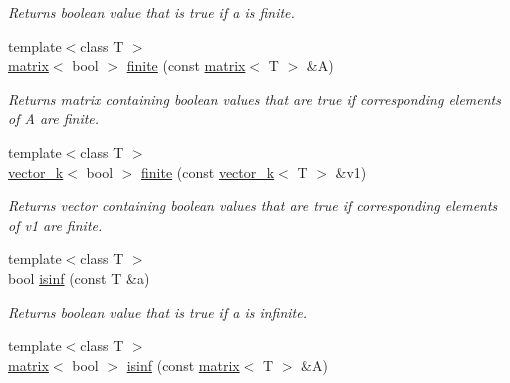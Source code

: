 \begin{DoxyCompactItemize}
\begin{DoxyCompactList}\small\item\em Returns boolean value that is true if a is finite. \end{DoxyCompactList}\item 
\hypertarget{namespacekeycpp_a8879482fc9af1a809453e1719948263b}{{\footnotesize template$<$class T $>$ }\\\hyperlink{classkeycpp_1_1matrix}{matrix}$<$ bool $>$ \hyperlink{namespacekeycpp_a8879482fc9af1a809453e1719948263b}{finite} (const \hyperlink{classkeycpp_1_1matrix}{matrix}$<$ T $>$ \&A)}\label{namespacekeycpp_a8879482fc9af1a809453e1719948263b}

\begin{DoxyCompactList}\small\item\em Returns matrix containing boolean values that are true if corresponding elements of A are finite. \end{DoxyCompactList}\item 
\hypertarget{namespacekeycpp_a83702fd83d07f4e3822abdcba5819dcb}{{\footnotesize template$<$class T $>$ }\\\hyperlink{classkeycpp_1_1vector__k}{vector\-\_\-k}$<$ bool $>$ \hyperlink{namespacekeycpp_a83702fd83d07f4e3822abdcba5819dcb}{finite} (const \hyperlink{classkeycpp_1_1vector__k}{vector\-\_\-k}$<$ T $>$ \&v1)}\label{namespacekeycpp_a83702fd83d07f4e3822abdcba5819dcb}

\begin{DoxyCompactList}\small\item\em Returns vector containing boolean values that are true if corresponding elements of v1 are finite. \end{DoxyCompactList}\item 
\hypertarget{namespacekeycpp_a852be6145adcca15ceaeb5a138651e20}{{\footnotesize template$<$class T $>$ }\\bool \hyperlink{namespacekeycpp_a852be6145adcca15ceaeb5a138651e20}{isinf} (const T \&a)}\label{namespacekeycpp_a852be6145adcca15ceaeb5a138651e20}

\begin{DoxyCompactList}\small\item\em Returns boolean value that is true if a is infinite. \end{DoxyCompactList}\item 
\hypertarget{namespacekeycpp_abf12e8a9c04720e074328bb1d34dce04}{{\footnotesize template$<$class T $>$ }\\\hyperlink{classkeycpp_1_1matrix}{matrix}$<$ bool $>$ \hyperlink{namespacekeycpp_abf12e8a9c04720e074328bb1d34dce04}{isinf} (const \hyperlink{classkeycpp_1_1matrix}{matrix}$<$ T $>$ \&A)}\label{namespacekeycpp_abf12e8a9c04720e074328bb1d34dce04}


\end{DoxyCompactItemize}
